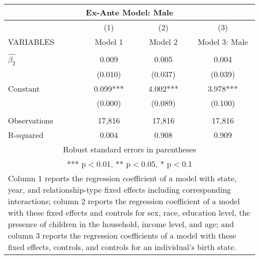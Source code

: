\begin{tabular}{lccc}
\multicolumn{4}{c}{Ex-Ante Model: Male} \\ \hline
 & (1) & (2) & (3) \\
VARIABLES & Model 1 & Model 2 & Model 3: Male \\ \hline
 &  &  &  \\
$\hat{\beta_2}$ & 0.009 & 0.005 & 0.004 \\
 & (0.010) & (0.037) & (0.039) \\
Constant & 0.099*** & 4.002*** & 3.978*** \\
 & (0.000) & (0.089) & (0.100) \\
 &  &  &  \\
Observations & 17,816 & 17,816 & 17,816 \\
 R-squared & 0.004 & 0.908 & 0.909 \\ \hline
\multicolumn{4}{c}{ Robust standard errors in parentheses} \\
\multicolumn{4}{c}{ *** p$<$0.01, ** p$<$0.05, * p$<$0.1} \\
\multicolumn{4}{p{0.8\linewidth}}{\small Column 1 reports the regression coefficient of a model with state, year, and relationship-type fixed effects including corresponding interactions; column 2 reports the regression coefficient of a model with these fixed effects and controls for sex, race, education level, the presence of children in the household, income level, and age; and column 3 reports the regression coefficients of a model with these fixed effects, controls, and controls for an individual’s birth state.} \\
\end{tabular}
